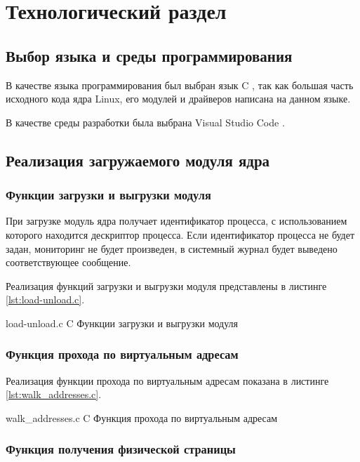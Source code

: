 \chapter{Технологический раздел}

\section{Выбор языка и среды программирования}

В качестве языка программирования был выбран язык C \cite{c}, так как большая часть исходного кода ядра Linux, его модулей и драйверов написана на данном языке.

В качестве среды разработки была выбрана Visual Studio Code \cite{vscode}.

\section{Реализация загружаемого модуля ядра}

\subsection{Функции загрузки и выгрузки модуля}

При загрузке модуль ядра получает идентификатор процесса, с использованием которого находится дескриптор процесса. Если идентификатор процесса не будет задан, мониторинг не будет произведен, в системный журнал будет выведено соответствующее сообщение.

Реализация функций загрузки и выгрузки модуля представлены в листинге \ref{lst:load-unload.c}.

    {load-unload.c}
    {C}
    {Функции загрузки и выгрузки модуля}
    
\subsection{Функция прохода по виртуальным адресам}

Реализация функции прохода по виртуальным адресам показана в листинге \ref{lst:walk_addresses.c}.

    {walk_addresses.c}
    {C}
    {Функция прохода по виртуальным адресам}
    
\newpage
    
\subsection{Функция получения физической страницы}

